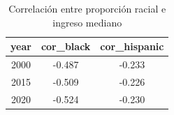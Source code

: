 \begin{table}[ht]
\centering
\caption{Correlación entre proporción racial e ingreso mediano} 
\label{tab:correlaciones}
\begin{tabular}{ccc}
  \toprule
year & cor\_black & cor\_hispanic \\ 
  \midrule
2000 & -0.487 & -0.233 \\ 
  2015 & -0.509 & -0.226 \\ 
  2020 & -0.524 & -0.230 \\ 
   \bottomrule
\end{tabular}
\end{table}
